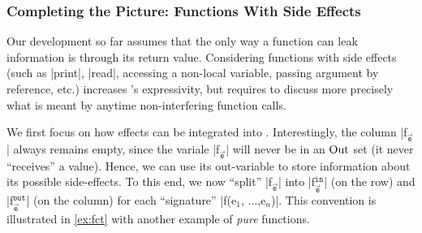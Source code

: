 \subsubsection{Completing the Picture: Functions With Side Effects}%
\label{ssec:impure-fct}

Our development so far assumes that the only way a function can leak information
is through its return value. Considering functions with side effects (such as
\prc|print|, \prc|read|, accessing a non-local variable, passing argument by
reference, etc.) increases \lname's expressivity, but requires to discuss more
precisely what is meant by anytime non-interfering function calls.


We first focus on how effects can be integrated into \lname. Interestingly, the
column \prc|f$_{\vec{\mathtt{e}}}$| always remains empty, since the variale
\prc|f$_{\vec{\mathtt{e}}}$| will never be in an \(\operatorname{Out}\) set (it never
\enquote{receives} a value). Hence, we can use its out-variable to store
information about its possible side-effects. To this end, we now \enquote{split}
\prc|f$_{\vec{\mathtt{e}}}$| into \prc|f$^{\mathtt{in}}_{\vec{\mathtt{e}}}$| (on
the row) and \prc|f$^{\mathtt{out}}_{\vec{\mathtt{e}}}$| (on the column) for
each \enquote{signature} \prc|f(e$_1$, $\hdots$,e$_n$)|. This convention is
illustrated in \autoref{ex:fct} with another example of \emph{pure} functions.

